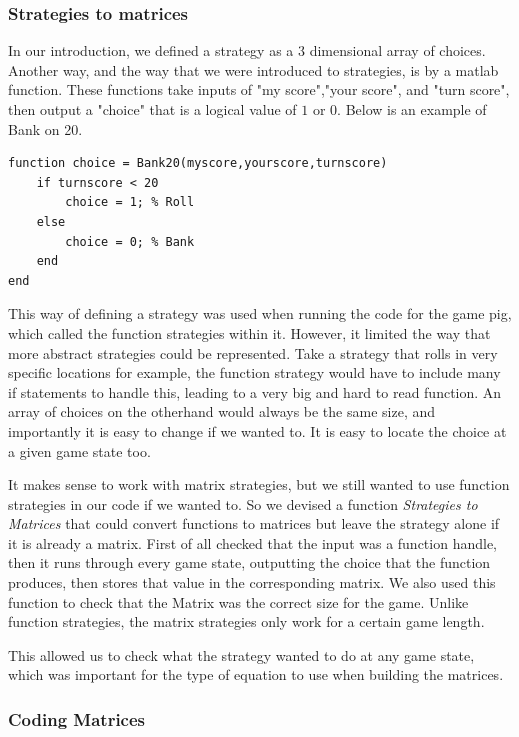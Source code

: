 \documentclass[a4paper,titlepage]{article}
\begin{document}
\subsubsection{Strategies to matrices}
In our introduction, we defined a strategy as a 3 dimensional array of choices. Another way, and the way that we were introduced to strategies, is by a matlab function. These functions take inputs of "my score","your score", and "turn score", then output a "choice" that is a logical value of $1$ or $0$. Below is an example of Bank on 20.

\begin{lstlisting}
function choice = Bank20(myscore,yourscore,turnscore)
	if turnscore < 20
		choice = 1; % Roll
	else
		choice = 0; % Bank
	end
end
\end{lstlisting}\label{bank20}

This way of defining a strategy was used when running the code for the game pig, which called the function strategies within it. However, it limited the way that more abstract strategies could be represented. Take a strategy that rolls in very specific locations for example, the function strategy would have to include many if statements to handle this, leading to a very big and hard to read function. An array of choices on the otherhand would always be the same size, and importantly it is easy to change if we wanted to. It is easy to locate the choice at a given game state too.

It makes sense to work with matrix strategies, but we still wanted to use function strategies in our code if we wanted to. So we devised a function \textit{Strategies to Matrices} that could convert functions to matrices but leave the strategy alone if it is already a matrix. First of all checked that the input was a function handle, then it runs through every game state, outputting the choice that the function produces, then stores that value in the corresponding matrix. We also used this function to check that the Matrix was the correct size for the game. Unlike function strategies, the matrix strategies only work for a certain game length.


This allowed us to check what the strategy wanted to do at any game state, which was important for the type of equation to use when building the matrices.

\subsubsection{Coding Matrices}
\end{document}
